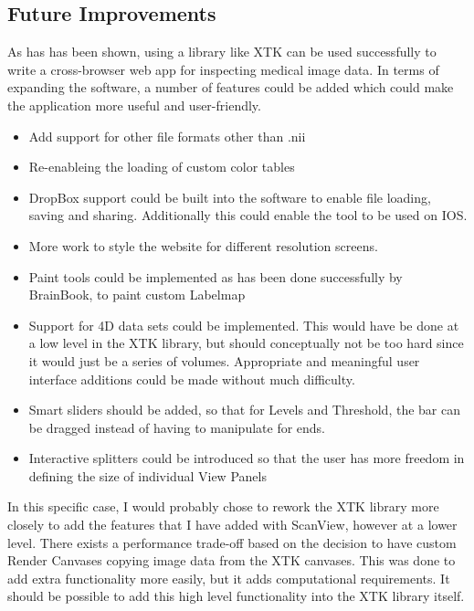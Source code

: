 \documentclass[a4paper,11pt,twoside]{article}
\begin{document}
\subsection{Future Improvements}

As has has been shown, using a library like XTK can be used successfully to write a cross-browser web app for inspecting medical image data. In terms of expanding the software, a number of features could be added which could make the application more useful and user-friendly.

\begin{itemize}
\item Add support for other file formats other than .nii
\item Re-enableing the loading of custom color tables
\item DropBox support could be built into the software to enable file loading, saving and sharing. Additionally this could enable the tool to be used on IOS.
\item More work to style the website for different resolution screens.
\item Paint tools could be implemented as has been done successfully by BrainBook, to paint custom Labelmap
\item Support for 4D data sets could be implemented. This would have be done at a low level in the XTK library, but should conceptually not be too hard since it would just be a series of volumes. Appropriate and meaningful user interface additions could be made without much difficulty.
\item Smart sliders should be added, so that for Levels and Threshold, the bar can be dragged instead of having to manipulate for ends.
\item Interactive splitters could be introduced so that the user has more freedom in defining the size of individual View Panels
\end{itemize}


In this specific case, I would probably chose to rework the XTK library more closely to add the features that I have added with ScanView, however at a lower level. There exists a performance trade-off based on the decision to have custom Render Canvases copying image data from the XTK canvases. This was done to add extra functionality more easily, but it adds computational requirements. It should be possible to add this high level functionality into the XTK library itself.
\end{document}
